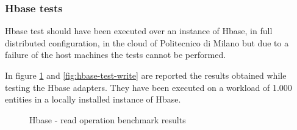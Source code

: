 \subsubsection{Hbase tests}
Hbase test should have been executed over an instance of Hbase, in full distributed configuration, in the cloud of Politecnico di Milano but due to a failure of the host machines the tests cannot be performed.

\noindent In figure \ref{fig:hbase-test-read} and \ref{fig:hbase-test-write} are reported the results obtained while testing the Hbase adapters. They have been executed on a workload of 1.000 entities in a locally installed instance of Hbase.

\begin{figure}[tbh]
  \centering
  \qquad
  \caption{Hbase - read operation benchmark results}
  \label{fig:hbase-test-read}
\end{figure} 

